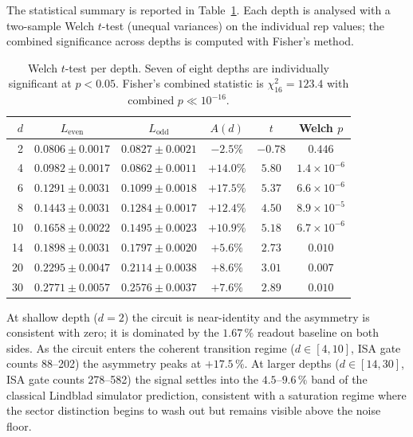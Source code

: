 \documentclass[reprint,aps,physrev,superscriptaddress,floatfix,longbibliography]{revtex4-2}
\begin{document}
The statistical summary is reported in Table~\ref{tab:welch}. Each
depth is analysed with a two-sample Welch $t$-test (unequal
variances) on the individual rep values; the combined significance
across depths is computed with Fisher's method.

\begin{table}[tb]
\centering
\small
\begin{tabular}{rccccc}
\toprule
$d$ & $L_\text{even}$ & $L_\text{odd}$ & $A(d)$ & $t$ & Welch $p$ \\
\midrule
 2 & $0.0806 \pm 0.0017$ & $0.0827 \pm 0.0021$ & $-2.5\%$   & $-0.78$ & $0.446$ \\
 4 & $0.0982 \pm 0.0017$ & $0.0862 \pm 0.0011$ & $+14.0\%$  & $5.80$  & $1.4\times 10^{-6}$ \\
 6 & $0.1291 \pm 0.0031$ & $0.1099 \pm 0.0018$ & $+17.5\%$  & $5.37$  & $6.6\times 10^{-6}$ \\
 8 & $0.1443 \pm 0.0031$ & $0.1284 \pm 0.0017$ & $+12.4\%$  & $4.50$  & $8.9\times 10^{-5}$ \\
10 & $0.1658 \pm 0.0022$ & $0.1495 \pm 0.0023$ & $+10.9\%$  & $5.18$  & $6.7\times 10^{-6}$ \\
14 & $0.1898 \pm 0.0031$ & $0.1797 \pm 0.0020$ & $+5.6\%$   & $2.73$  & $0.010$ \\
20 & $0.2295 \pm 0.0047$ & $0.2114 \pm 0.0038$ & $+8.6\%$   & $3.01$  & $0.007$ \\
30 & $0.2771 \pm 0.0057$ & $0.2576 \pm 0.0037$ & $+7.6\%$   & $2.89$  & $0.010$ \\
\bottomrule
\end{tabular}
\caption{Welch $t$-test per depth. Seven of eight depths are
individually significant at $p < 0.05$. Fisher's combined statistic
is $\chi^2_{16} = 123.4$ with combined $p \ll 10^{-16}$.}
\label{tab:welch}
\end{table}

At shallow depth ($d = 2$) the circuit is near-identity and the
asymmetry is consistent with zero; it is dominated by the $1.67\,\%$
readout baseline on both sides. As the circuit enters the coherent
transition regime ($d \in [4, 10]$, ISA gate counts 88--202) the
asymmetry peaks at $+17.5\,\%$. At larger depths ($d \in [14, 30]$,
ISA gate counts 278--582) the signal settles into the
$4.5$--$9.6\,\%$ band of the classical Lindblad simulator prediction,
consistent with a saturation regime where the sector distinction
begins to wash out but remains visible above the noise floor.

\end{document}
